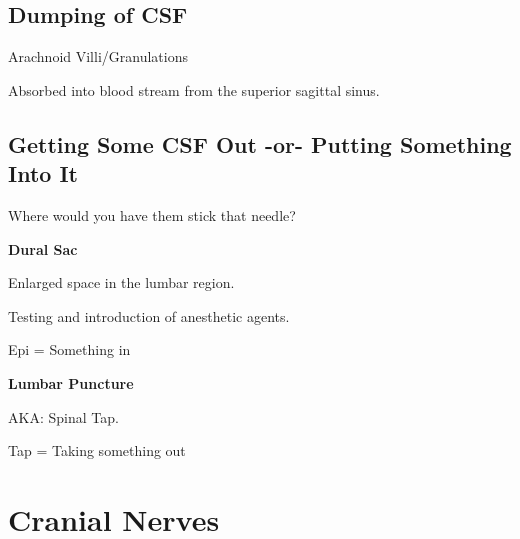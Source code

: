 \subsection{Dumping of CSF}

\begin{coloredlist}
    \item Arachnoid Villi/Granulations
    \begin{coloredlist}
        \item Absorbed into blood stream from the superior sagittal sinus.
    \end{coloredlist}
\end{coloredlist}

\subsection{Getting Some CSF Out -or- Putting Something Into It}

\begin{coloredlist}
    \item Where would you have them stick that needle?
    \begin{coloredlist}
        \item \textbf{Dural Sac}
        \begin{coloredlist}
            \item Enlarged space in the lumbar region.
            \item Testing and introduction of anesthetic agents.
            \item Epi = Something in
        \end{coloredlist}
        \item \textbf{Lumbar Puncture}
        \begin{coloredlist}
            \item AKA: Spinal Tap.
            \item Tap = Taking something out
        \end{coloredlist}
    \end{coloredlist}
\end{coloredlist}

\section{Cranial Nerves}

